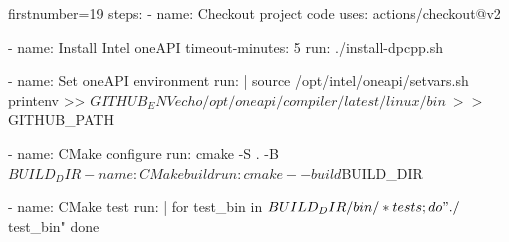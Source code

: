 \begin{bashcode*}{firstnumber=19}
    steps:
    - name: Checkout project code
      uses: actions/checkout@v2

    - name: Install Intel oneAPI
      timeout-minutes: 5
      run: ./install-dpcpp.sh

    - name: Set oneAPI environment
      run: |
        source /opt/intel/oneapi/setvars.sh
        printenv >> $GITHUB_ENV
        echo /opt/oneapi/compiler/latest/linux/bin \
          >> $GITHUB_PATH

    - name: CMake configure
      run: cmake -S . -B $BUILD_DIR

    - name: CMake build
      run: cmake --build $BUILD_DIR

    - name: CMake test
      run: |
        for test_bin in $BUILD_DIR/bin/*tests; do 
          "./$test_bin"
        done
\end{bashcode*}